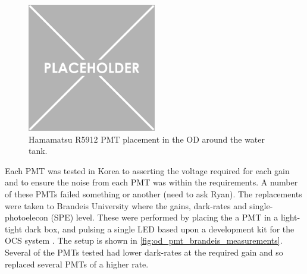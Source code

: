 \begin{figure}
    \centering
    \includegraphics[width=0.5\textwidth]{Figures/Placeholder.png}
    \caption{Hamamatsu R5912 PMT placement in the OD around the water tank.}
    \label{fig:od_pmt_placement}
\end{figure}




\par
Each PMT was tested in Korea to asserting the voltage required for each gain and to ensure the noise from each PMT was within the requirements.
A number of these PMTs failed something or another (need to ask Ryan).
The replacements were taken to Brandeis University where the gains, dark-rates and single-photoelecon (SPE) level.
These were performed by placing the a PMT in a light-tight dark box, and pulsing a single LED based upon a development kit for the OCS system \cite{lz_ocs_system_ref}.
The setup is shown in \autoref{fig:od_pmt_brandeis_measurements}.
Several of the PMTs tested had lower dark-rates at the required gain and so replaced several PMTs of a higher rate.

